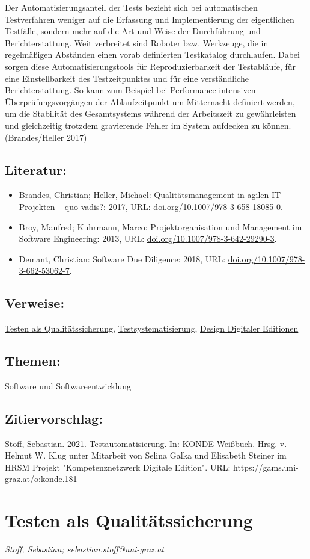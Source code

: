 \documentclass{article}
\begin{document}
        Der Automatisierungsanteil der Tests bezieht sich bei automatischen Testverfahren weniger auf die Erfassung und Implementierung der eigentlichen Testfälle, sondern mehr auf die Art und Weise der Durchführung und Berichterstattung. Weit verbreitet sind Roboter bzw. Werkzeuge, die in regelmäßigen Abständen einen vorab definierten Testkatalog durchlaufen. Dabei sorgen diese Automatisierungstools für Reproduzierbarkeit der Testabläufe, für eine Einstellbarkeit des Testzeitpunktes und für eine verständliche Berichterstattung. So kann zum Beispiel bei Performance-intensiven Überprüfungsvorgängen der Ablaufzeitpunkt um Mitternacht definiert werden, um die Stabilität des Gesamtsystems während der Arbeitszeit zu gewährleisten und gleichzeitig trotzdem gravierende Fehler im System aufdecken zu können. (Brandes/Heller 2017)\\
            
        \subsection*{Literatur:}\begin{itemize}\item Brandes, Christian; Heller, Michael: Qualitätsmanagement in agilen IT-Projekten – quo vadis?: 2017, URL: \url{doi.org/10.1007/978-3-658-18085-0}.\item Broy, Manfred; Kuhrmann, Marco: Projektorganisation und Management im Software Engineering: 2013, URL: \url{doi.org/10.1007/978-3-642-29290-3}.\item Demant, Christian: Software Due Diligence: 2018, URL: \url{doi.org/10.1007/978-3-662-53062-7}.\end{itemize}\subsection*{Verweise:}\href{https://gams.uni-graz.at/o:konde.182}{Testen als Qualitätssicherung}, \href{https://gams.uni-graz.at/o:konde.183}{Testsystematisierung}, \href{https://gams.uni-graz.at/o:konde.56}{Design Digitaler Editionen}\subsection*{Themen:}Software und Softwareentwicklung\subsection*{Zitiervorschlag:}Stoff, Sebastian. 2021. Testautomatisierung. In: KONDE Weißbuch. Hrsg. v. Helmut W. Klug unter Mitarbeit von Selina Galka und Elisabeth Steiner im HRSM Projekt "Kompetenznetzwerk Digitale Edition". URL: https://gams.uni-graz.at/o:konde.181\newpage\section*{Testen als Qualitätssicherung} \emph{Stoff, Sebastian; sebastian.stoff@uni-graz.at }\\
        
\end{document}
